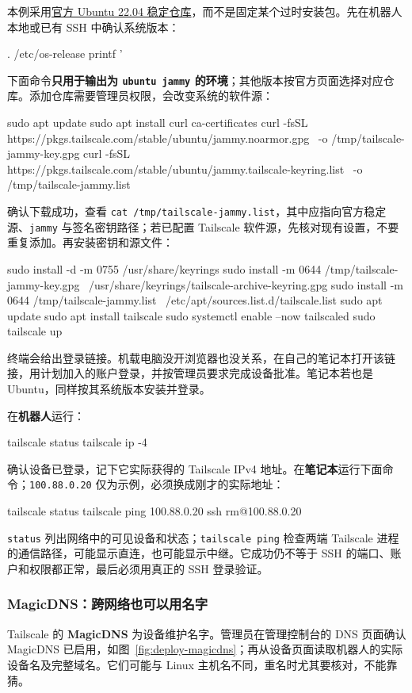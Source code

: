\begin{example}
本例采用\href{https://pkgs.tailscale.com/stable/#ubuntu-2204}{官方 Ubuntu 22.04 稳定仓库}，而不是固定某个过时安装包。先在机器人本地或已有 SSH 中确认系统版本：
\begin{tbash}
. /etc/os-release
printf '%
\end{tbash}
下面命令\textbf{只用于输出为 \texttt{ubuntu jammy} 的环境}；其他版本按官方页面选择对应仓库。添加仓库需要管理员权限，会改变系统的软件源：
\begin{tbash}
sudo apt update
sudo apt install curl ca-certificates
curl -fsSL https://pkgs.tailscale.com/stable/ubuntu/jammy.noarmor.gpg \
  -o /tmp/tailscale-jammy-key.gpg
curl -fsSL https://pkgs.tailscale.com/stable/ubuntu/jammy.tailscale-keyring.list \
  -o /tmp/tailscale-jammy.list
\end{tbash}
确认下载成功，查看 \texttt{cat /tmp/tailscale-jammy.list}，其中应指向官方稳定源、\texttt{jammy} 与签名密钥路径；若已配置 Tailscale 软件源，先核对现有设置，不要重复添加。再安装密钥和源文件：
\begin{tbash}
sudo install -d -m 0755 /usr/share/keyrings
sudo install -m 0644 /tmp/tailscale-jammy-key.gpg \
  /usr/share/keyrings/tailscale-archive-keyring.gpg
sudo install -m 0644 /tmp/tailscale-jammy.list \
  /etc/apt/sources.list.d/tailscale.list
sudo apt update
sudo apt install tailscale
sudo systemctl enable --now tailscaled
sudo tailscale up
\end{tbash}
终端会给出登录链接。机载电脑没开浏览器也没关系，在自己的笔记本打开该链接，用计划加入的账户登录，并按管理员要求完成设备批准。笔记本若也是 Ubuntu，同样按其系统版本安装并登录。

在\textbf{机器人}运行：
\begin{tbash}
tailscale status
tailscale ip -4
\end{tbash}
确认设备已登录，记下它实际获得的 Tailscale IPv4 地址。在\textbf{笔记本}运行下面命令；\texttt{100.88.0.20} 仅为示例，必须换成刚才的实际地址：
\begin{tbash}
tailscale status
tailscale ping 100.88.0.20
ssh rm@100.88.0.20
\end{tbash}
\texttt{status} 列出网络中的可见设备和状态；\texttt{tailscale ping} 检查两端 Tailscale 进程的通信路径，可能显示直连，也可能显示中继。它成功仍不等于 SSH 的端口、账户和权限都正常，最后必须用真正的 SSH 登录验证。
\end{example}

\subsubsection{MagicDNS：跨网络也可以用名字}
Tailscale 的 \textbf{MagicDNS} 为设备维护名字。管理员在管理控制台的 DNS 页面确认 MagicDNS 已启用，如图~\ref{fig:deploy-magicdns}；再从设备页面读取机器人的实际设备名及完整域名。它们可能与 Linux 主机名不同，重名时尤其要核对，不能靠猜。

